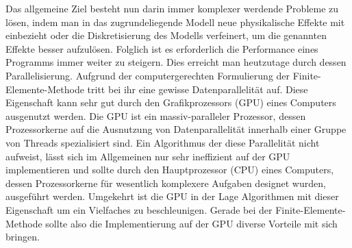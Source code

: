 \documentclass[crop=false]{standalone}
\begin{document}
    Das allgemeine Ziel besteht nun darin immer komplexer werdende Probleme zu lösen, indem man in das zugrundeliegende Modell neue physikalische Effekte mit einbezieht oder die Diskretisierung des Modells verfeinert, um die genannten Effekte besser aufzulösen.
    Folglich ist es erforderlich die Performance eines Programms immer weiter zu steigern.
    Dies erreicht man heutzutage durch dessen Parallelisierung.
    Aufgrund der computergerechten Formulierung der Finite-Elemente-Methode tritt bei ihr eine gewisse Datenparallelität auf.
    Diese Eigenschaft kann sehr gut durch den Grafikprozessors (GPU) eines Computers ausgenutzt werden.
    Die GPU ist ein massiv-paralleler Prozessor, dessen Prozessorkerne auf die Ausnutzung von Datenparallelität innerhalb einer Gruppe von Threads spezialisiert sind.
    Ein Algorithmus der diese Parallelität nicht aufweist, lässt sich im Allgemeinen nur sehr ineffizient auf der GPU implementieren und sollte durch den Hauptprozessor (CPU) eines Computers, dessen Prozessorkerne für wesentlich komplexere Aufgaben designet wurden, ausgeführt werden.
    Umgekehrt ist die GPU in der Lage Algorithmen mit dieser Eigenschaft um ein Vielfaches zu beschleunigen.
    Gerade bei der Finite-Elemente-Methode sollte also die Implementierung auf der GPU diverse Vorteile mit sich bringen.
    \cite{Patterson2011,Kirk2010,Sanders2011}

\end{document}
